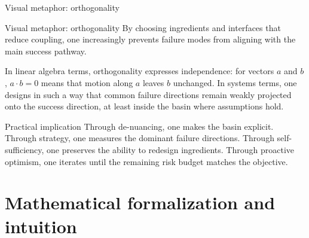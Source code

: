 \documentclass[presentation,aspectratio=169,11pt]{beamer}
\begin{document}
\begin{frame}{Visual metaphor: orthogonality}
\centering
{}
\end{frame}

\begin{frame}{Visual metaphor: orthogonality}
\justifying
\small
By choosing ingredients and interfaces that reduce coupling, one increasingly prevents failure modes from aligning with the main success pathway.

\vspace{0.6em}
In linear algebra terms, orthogonality expresses independence: for vectors $a$ and $b$, $a\cdot b = 0$ means that motion along $a$ leaves $b$ unchanged. In systems terms, one designs in such a way that common failure directions remain weakly projected onto the success direction, at least inside the basin where assumptions hold.

\vspace{0.8em}
\begin{block}{Practical implication}
\justifying
Through de-nuancing, one makes the basin explicit. Through strategy, one measures the dominant failure directions. Through self-sufficiency, one preserves the ability to redesign ingredients. Through proactive optimism, one iterates until the remaining risk budget matches the objective.
\end{block}
\end{frame}

\section{Mathematical formalization and intuition}
\end{document}
